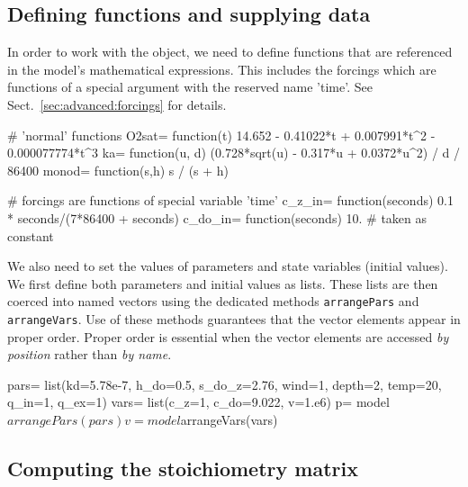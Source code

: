 \documentclass[times,onecolumn]{article}
\begin{document}
\subsection{Defining functions and supplying data}

In order to work with the object, we need to define functions that are referenced in the model's mathematical expressions. This includes the forcings which are functions of a special argument with the reserved name 'time'. See Sect.~\ref{sec:advanced:forcings} for details.

\begin{Schunk}
\begin{Sinput}
 # 'normal' functions
 O2sat= function(t) {
   14.652 - 0.41022*t + 0.007991*t^2 - 0.000077774*t^3
 }
 ka= function(u, d) {
   (0.728*sqrt(u) - 0.317*u + 0.0372*u^2) / d / 86400
 }
 monod= function(s,h) {
   s / (s + h)
 }
\end{Sinput}
\end{Schunk}

\begin{Schunk}
\begin{Sinput}
 # forcings are functions of special variable 'time'
 c_z_in= function(seconds) {
   0.1 * seconds/(7*86400 + seconds)
 }
 c_do_in= function(seconds) {
   10.  # taken as constant
 }
\end{Sinput}
\end{Schunk}

We also need to set the values of parameters and state variables (initial values). We first define both parameters and initial values as lists. These lists are then coerced into named vectors using the dedicated methods \verb|arrangePars| and \verb|arrangeVars|. Use of these methods guarantees that the vector elements appear in proper order. Proper order is essential when the vector elements are accessed \emph{by position} rather than \emph{by name}.

\begin{Schunk}
\begin{Sinput}
 pars= list(kd=5.78e-7, h_do=0.5, s_do_z=2.76, wind=1, depth=2,
  temp=20, q_in=1, q_ex=1)
 vars= list(c_z=1, c_do=9.022, v=1.e6)
 p= model$arrangePars(pars)
 v= model$arrangeVars(vars)
\end{Sinput}
\end{Schunk}

\subsection{Computing the stoichiometry matrix}
\end{document}
